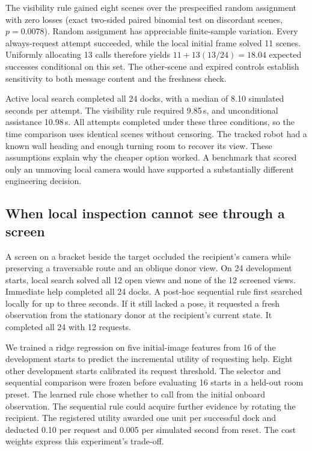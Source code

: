 \documentclass[conference]{IEEEtran}
\begin{document}
The visibility rule gained eight scenes over the prespecified random assignment with zero losses (exact two-sided paired binomial test on discordant scenes, $p=0.0078$). Random assignment has appreciable finite-sample variation. Every always-request attempt succeeded, while the local initial frame solved 11 scenes. Uniformly allocating 13 calls therefore yields $11+13(13/24)=18.04$ expected successes conditional on this set. The other-scene and expired controls establish sensitivity to both message content and the freshness check.

Active local search completed all 24 docks, with a median of 8.10 simulated seconds per attempt. The visibility rule required 9.85\,s, and unconditional assistance 10.98\,s. All attempts completed under these three conditions, so the time comparison uses identical scenes without censoring. The tracked robot had a known wall heading and enough turning room to recover its view. These assumptions explain why the cheaper option worked. A benchmark that scored only an unmoving local camera would have supported a substantially different engineering decision.

\subsection{When local inspection cannot see through a screen}
A screen on a bracket beside the target occluded the recipient's camera while preserving a traversable route and an oblique donor view. On 24 development starts, local search solved all 12 open views and none of the 12 screened views. Immediate help completed all 24 docks. A post-hoc sequential rule first searched locally for up to three seconds. If it still lacked a pose, it requested a fresh observation from the stationary donor at the recipient's current state. It completed all 24 with 12 requests.

We trained a ridge regression on five initial-image features from 16 of the development starts to predict the incremental utility of requesting help. Eight other development starts calibrated its request threshold. The selector and sequential comparison were frozen before evaluating 16 starts in a held-out room preset. The learned rule chose whether to call from the initial onboard observation. The sequential rule could acquire further evidence by rotating the recipient. The registered utility awarded one unit per successful dock and deducted 0.10 per request and 0.005 per simulated second from reset. The cost weights express this experiment's trade-off.
\end{document}

